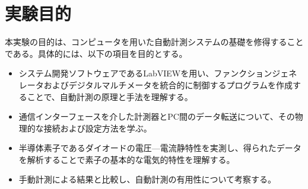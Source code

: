 \section{実験目的}
本実験の目的は、コンピュータを用いた自動計測システムの基礎を修得することである。具体的には、以下の項目を目的とする。

\begin{itemize}
    \item システム開発ソフトウェアであるLabVIEWを用い、ファンクションジェネレータおよびデジタルマルチメータを統合的に制御するプログラムを作成することで、自動計測の原理と手法を理解する。
    \item 通信インターフェースを介した計測器とPC間のデータ転送について、その物理的な接続および設定方法を学ぶ。
    \item 半導体素子であるダイオードの電圧—電流静特性を実測し、得られたデータを解析することで素子の基本的な電気的特性を理解する。
    \item 手動計測による結果と比較し、自動計測の有用性について考察する。
\end{itemize}